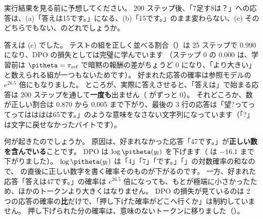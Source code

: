 \begin{quiz}
実行結果を見る前に予想してください。
200 ステップ後、「7足す8は？」への応答は、(a)「答えは15です。」になる、(b)「15です。」のまま変わらない、(c) そのどちらでもない、のどれでしょうか。
\end{quiz}


答えは (c) でした。
テストの組を正しく並べる割合（）は 25 ステップで 0.990 になり、DPO の損失としては完璧に学んでいます
（ステップ 0 の 0.000 は、学習前は $\pitheta=\pi_{\text{ref}}$ で暗黙の報酬の差がちょうど 0 になり、「より大きい」と数えられる組が一つもないためです）。
好まれた応答の確率は参照モデルの $e^{26.5}$ 倍にもなりました。
ところが、実際に答えさせると、「答えは」で始まる応答は 200 ステップを通して\textbf{一度も}出ません（ がずっと 0）。
それどころか、数が正しい割合は 0.870 から 0.005 まで下がり、最後の 3 行の応答は「望?ってってってはははは65です。」のような意味をなさない文字列になっています（「?」は文字に戻せなかったバイトです）。

何が起きたのでしょうか。
原因は、好まれなかった応答「47です。」が\textbf{正しい数を含んでいる}ことです。
DPO は $\log\pitheta(y_l)$ を下げます（ は $-16.1$ まで下がりました）。
$\log\pitheta(y_l)$ は「4」「7」「です。」「」の対数確率の和なので、
 の直後に正しい数字を書く確率そのものが下がるのです。
一方、好まれた応答「答えは47です。」の確率は $e^{26.5}$ 倍になっても、もとが極端に小さかったため、ほかのトークンより大きくはなりません。
DPO の損失が見ているのは 2 つの応答の確率の\textbf{比}だけで、「押し下げた確率がどこへ行くか」は制約していません。
押し下げられた分の確率は、意味のないトークンに移りました（）。

